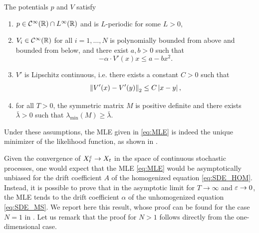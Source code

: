\documentclass[10pt]{article}
\begin{document}
\begin{assumption}\label{as:regularity} The potentials $p$ and $V$ satisfy
	\begin{enumerate}
		\item $p \in \mathcal C^\infty(\mathbb{R}) \cap L^\infty(\mathbb{R})$ and is $L$-periodic for some $L > 0$,
		\item\label{as:regularity_diss} $V_i \in \mathcal C^\infty(\mathbb{R})$ for all $i=1, \ldots, N$ is polynomially bounded from above and bounded from below,  and there exist $a,b > 0$ such that
		\begin{equation}
		-\alpha \cdot V'(x) x \leq a - bx^2.
		\end{equation} 
		\item $V'$ is Lipschitz continuous, i.e. there exists a constant $C > 0$ such that
		\begin{equation}
			\left\|V'(x) - V'(y)\right\|_2 \leq C\left\lvert x - y\right\rvert,
		\end{equation} 
		\item for all $T > 0$, the symmetric matrix $M$ is positive definite and there exists $\bar \lambda > 0$ such that $\lambda_{\min}(M) \geq \bar \lambda$.
	\end{enumerate}
\end{assumption}


Under these assumptions, the MLE given in \eqref{eq:MLE} is indeed the unique minimizer of the likelihood function, as shown in \cite[Theorem 2.4]{PSV09}.

Given the convergence of $X^\varepsilon_t \to X_t$ in the space of continuous stochastic processes, one would expect that the MLE \eqref{eq:MLE} would be asymptotically unbiased for the drift coefficient $A$ of the homogenized equation \eqref{eq:SDE_HOM}. Instead, it is possible to prove that in the asymptotic limit for $T \to \infty$ and $\varepsilon \to 0$, the MLE tends to the drift coefficient $\alpha$ of the unhomogenized equation \eqref{eq:SDE_MS}. We report here this result, whose proof can be found for the case $N = 1$ in \cite[Theorem 3.4]{PaS07}. Let us remark that the proof for $N > 1$ follows directly from the one-dimensional case.
\end{document}
